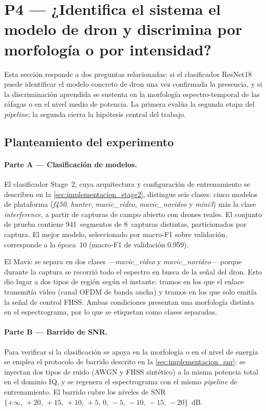 \section{P4 --- ¿Identifica el sistema el modelo de dron y discrimina por morfología o por intensidad?}
\label{sec:bloque_clasificacion}

Esta sección responde a dos preguntas relacionadas: si el clasificador ResNet18 puede identificar el modelo concreto de dron una vez confirmada la presencia, y si la discriminación aprendida se sustenta en la morfología espectro-temporal de las ráfagas o en el nivel medio de potencia. La primera evalúa la segunda etapa del \emph{pipeline}; la segunda cierra la hipótesis central del trabajo.

\subsection{Planteamiento del experimento}
\label{sec:p4_planteamiento}

\paragraph{Parte A --- Clasificación de modelos.}
El clasificador Stage~2, cuya arquitectura y configuración de entrenamiento se describen en la \cref{sec:implementacion_stage2}, distingue seis clases: cinco modelos de plataforma (\emph{f450}, \emph{hunter}, \emph{mavic\_video}, \emph{mavic\_novideo} y \emph{mini3}) más la clase \emph{interference}, a partir de capturas de campo abierto con drones reales. El conjunto de prueba contiene \num{941}~segmentos de \num{8}~capturas distintas, particionados por captura. El mejor modelo, seleccionado por macro-F1 sobre validación, corresponde a la época~\num{10} (macro-F1 de validación \num{0,959}).

El Mavic se separa en dos clases ---\emph{mavic\_video} y \emph{mavic\_novideo}--- porque durante la captura se recorrió todo el espectro en busca de la señal del dron. Esto dio lugar a dos tipos de región según el instante: tramos en los que el enlace transmitía vídeo (canal OFDM de banda ancha) y tramos en los que solo emitía la señal de control FHSS. Ambas condiciones presentan una morfología distinta en el espectrograma, por lo que se etiquetan como clases separadas.

\paragraph{Parte B --- Barrido de SNR.}
Para verificar si la clasificación se apoya en la morfología o en el nivel de energía se emplea el protocolo de barrido descrito en la \cref{sec:implementacion_snr}: se inyectan dos tipos de ruido (AWGN y FHSS sintético) a la misma potencia total en el dominio IQ, y se regenera el espectrograma con el mismo \emph{pipeline} de entrenamiento. El barrido cubre los niveles de SNR $\{+\infty,\, +20,\, +15,\, +10,\, +5,\, 0,\, -5,\, -10,\, -15,\, -20\}$~dB.

